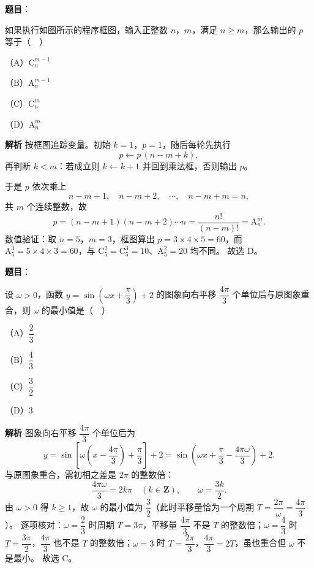 \begin{answer}

\textbf{题目}：

如果执行如图所示的程序框图，输入正整数 $n$，$m$，满足 $n\geqslant m$，那么输出的 $p$ 等于（　）

（A）$\mathrm C_n^{m-1}$

（B）$\mathrm A_n^{m-1}$

（C）$\mathrm C_n^{m}$

（D）$\mathrm A_n^{m}$
\nopagebreak[4]
\begin{center}\end{center}
\nopagebreak[4]
\textbf{解析}
按框图追踪变量。初始 $k=1$，$p=1$，随后每轮先执行
\nopagebreak[4]
\[p\leftarrow p\,(n-m+k),\]
再判断 $k<m$：若成立则 $k\leftarrow k+1$ 并回到乘法框，否则输出 $p$。

于是 $p$ 依次乘上
\nopagebreak[4]
\[n-m+1,\quad n-m+2,\quad\cdots,\quad n-m+m=n,\]
共 $m$ 个连续整数，故
\nopagebreak[4]
\[p=(n-m+1)(n-m+2)\cdots n=\frac{n!}{(n-m)!}=\mathrm A_n^m.\]
数值验证：取 $n=5$，$m=3$，框图算出 $p=3\times4\times5=60$，而 $\mathrm A_5^3=5\times4\times3=60$，与 $\mathrm C_5^2=\mathrm C_5^3=10$、$\mathrm A_5^2=20$ 均不同。
故选 D。


\end{answer}
\begin{answer}

\textbf{题目}：

设 $\omega>0$，函数 $y=\sin\left(\omega x+\dfrac{\pi}{3}\right)+2$ 的图象向右平移 $\dfrac{4\pi}{3}$ 个单位后与原图象重合，则 $\omega$ 的最小值是（　）

（A）$\dfrac23$

（B）$\dfrac43$

（C）$\dfrac32$

（D）$3$

\textbf{解析}
图象向右平移 $\dfrac{4\pi}{3}$ 个单位后为
\nopagebreak[4]
\[y=\sin\left[\omega\left(x-\frac{4\pi}{3}\right)+\frac{\pi}{3}\right]+2
=\sin\left(\omega x+\frac{\pi}{3}-\frac{4\pi\omega}{3}\right)+2.\]
与原图象重合，需初相之差是 $2\pi$ 的整数倍：
\nopagebreak[4]
\[\frac{4\pi\omega}{3}=2k\pi\quad(k\in\mathbf Z),\qquad \omega=\frac{3k}{2}.\]
由 $\omega>0$ 得 $k\geqslant1$，故 $\omega$ 的最小值为 $\dfrac32$（此时平移量恰为一个周期 $T=\dfrac{2\pi}{\omega}=\dfrac{4\pi}{3}$）。
逐项核对：$\omega=\dfrac23$ 时周期 $T=3\pi$，平移量 $\dfrac{4\pi}{3}$ 不是 $T$ 的整数倍；$\omega=\dfrac43$ 时 $T=\dfrac{3\pi}{2}$，$\dfrac{4\pi}{3}$ 也不是 $T$ 的整数倍；$\omega=3$ 时 $T=\dfrac{2\pi}{3}$，$\dfrac{4\pi}{3}=2T$，虽也重合但 $\omega$ 不是最小。
故选 C。


\end{answer}
